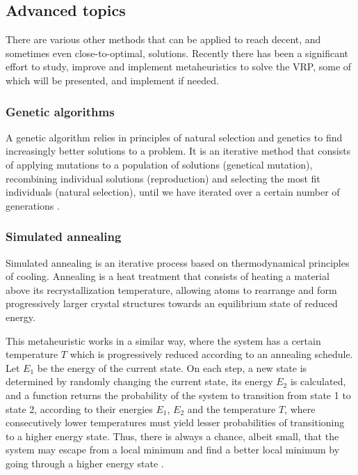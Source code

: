\subsection{Advanced topics} \label{algorithm-vrp-advanced}
There are various other methods that can be applied to reach decent, and sometimes even close-to-optimal, solutions. Recently there has been a significant effort to study, improve and implement \glspl{metaheuristic} to solve the \acrshort*{VRP}, some of which will be presented, and implement if needed.
\subsubsection{Genetic algorithms}
A genetic algorithm relies in principles of \gls{natural selection} and genetics to find increasingly better solutions to a problem. It is an \gls{iterative} method that consists of applying mutations to a population of solutions (genetical mutation), recombining individual solutions (reproduction) and selecting the most fit individuals (natural selection), until we have iterated over a certain number of generations \cite{intro-genetic-algs}.
\subsubsection{Simulated annealing}
Simulated annealing is an \gls{iterative} process based on thermodynamical principles of cooling. Annealing is a heat treatment that consists of heating a material above its recrystallization temperature, allowing atoms to rearrange and form progressively larger crystal structures towards an equilibrium state of reduced energy.\par
This metaheuristic works in a similar way, where the system has a certain temperature $T$ which is progressively reduced according to an annealing schedule. Let $E_1$ be the energy of the current state. On each step, a new state is determined by randomly changing the current state, its energy $E_2$ is calculated, and a function returns the probability of the system to transition from state 1 to state 2, according to their energies $E_1$, $E_2$ and the temperature $T$, where consecutively lower temperatures must yield lesser probabilities of transitioning to a higher energy state. Thus, there is always a chance, albeit small, that the system may escape from a local minimum and find a better local minimum by going through a higher energy state \cite{numerical-recipes}.
